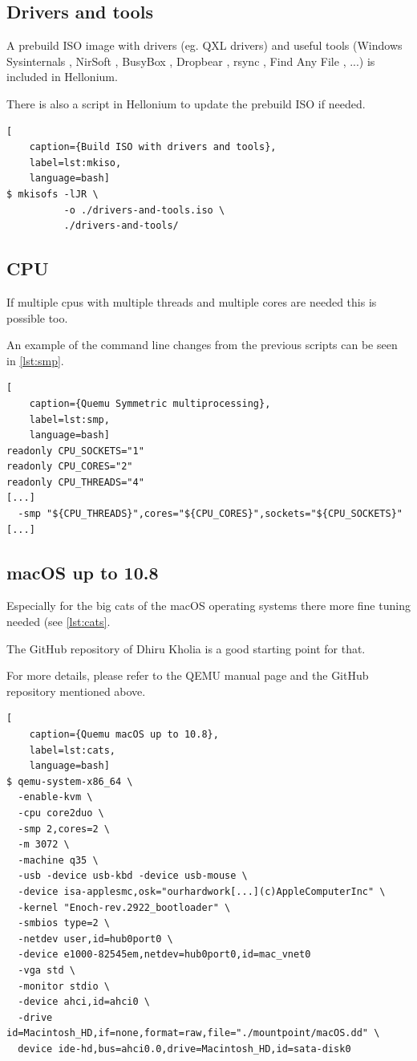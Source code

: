 \subsection{Drivers and tools}

A prebuild ISO image with drivers (eg.  QXL drivers) and useful tools (Windows Sysinternals \cite{Sysinternals}, NirSoft \cite{Nirsoft}, BusyBox \cite{Busybox}, Dropbear \cite{Dropbear}, rsync \cite{Rsync}, Find Any File \cite{FindAnyFile}, ...) is included in Hellonium.

There is also a script in Hellonium to update the prebuild ISO if needed.

\begin{lstlisting}[
    caption={Build ISO with drivers and tools},
    label=lst:mkiso,
    language=bash]
$ mkisofs -lJR \
          -o ./drivers-and-tools.iso \
          ./drivers-and-tools/
\end{lstlisting}

\subsection{CPU}

If multiple cpus with multiple threads and multiple cores are needed this is possible too.

An example of the command line changes from the previous scripts can be seen in \cref{lst:smp}.

\begin{lstlisting}[
    caption={Quemu Symmetric multiprocessing},
    label=lst:smp,
    language=bash]
readonly CPU_SOCKETS="1"
readonly CPU_CORES="2"
readonly CPU_THREADS="4"
[...]
  -smp "${CPU_THREADS}",cores="${CPU_CORES}",sockets="${CPU_SOCKETS}"
[...]
\end{lstlisting}

\subsection{macOS up to 10.8}

Especially for the big cats of the macOS operating systems there more fine tuning needed (see \cref{lst:cats}.

The GitHub repository of Dhiru Kholia \cite{OSXKVM}is a good starting point for that.

For more details, please refer to the QEMU manual page and the GitHub repository mentioned above.

\begin{lstlisting}[
    caption={Quemu macOS up to 10.8},
    label=lst:cats,
    language=bash]
$ qemu-system-x86_64 \
  -enable-kvm \
  -cpu core2duo \
  -smp 2,cores=2 \
  -m 3072 \
  -machine q35 \
  -usb -device usb-kbd -device usb-mouse \
  -device isa-applesmc,osk="ourhardwork[...](c)AppleComputerInc" \
  -kernel "Enoch-rev.2922_bootloader" \
  -smbios type=2 \
  -netdev user,id=hub0port0 \
  -device e1000-82545em,netdev=hub0port0,id=mac_vnet0
  -vga std \
  -monitor stdio \
  -device ahci,id=ahci0 \
  -drive id=Macintosh_HD,if=none,format=raw,file="./mountpoint/macOS.dd" \
  device ide-hd,bus=ahci0.0,drive=Macintosh_HD,id=sata-disk0
\end{lstlisting}

